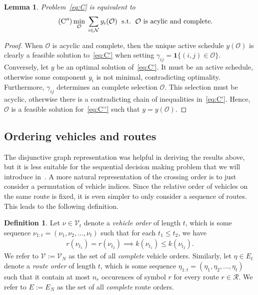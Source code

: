 \documentclass{report}
\theoremstyle{definition}
\newtheorem{define}{Definition}[chapter]
\theoremstyle{plain}
\newtheorem{lemma}{Lemma}[chapter]
\begin{document}
\begin{lemma}\label{lemma:disj-graph-optimization}
  Problem~\eqref{eq:C} is equivalent to
  \begin{align}
    \label{eq:C''}
    \tag{$\mathrm{C}^{\prime\prime}$}
    \min_{\mathcal{O}} \; \sum_{i \in \mathcal{N}} y_i(\mathcal{O}) \; \text{ s.t. } \, \mathcal{O} \text{ is acylic and complete. }
  \end{align}
\end{lemma}
\begin{proof}
  When $\mathcal{O}$ is acyclic and complete, then the unique active schedule
  $y(\mathcal{O})$ is clearly a feasible solution to~\eqref{eq:C'} when setting
  $\gamma_{ij} = \mathbf{1} \{ (i,j) \in \mathcal{O} \}$.
  Conversely, let $y$ be an optimal solution of~\eqref{eq:C'}. It must be an active
  schedule, otherwise some component $y_i$ is not minimal, contradicting
  optimality. Furthermore, $\gamma_{ij}$ determines an complete selection
  $\mathcal{O}$. This selection must be acyclic, otherwise there is a
  contradicting chain of inequalities in~\eqref{eq:C'}.
  Hence, $\mathcal{O}$ is a feasible solution
  for~\eqref{eq:C''} such that $y = y(\mathcal{O})$.
\end{proof}

\clearpage
\subsection{Ordering vehicles and routes}

The disjunctive graph representation was helpful in deriving the results above,
but it is less suitable for the sequential decision making problem that we will
introduce in~.
%
A more natural representation of the crossing order is to just consider a
permutation of vehicle indices.
%
Since the relative order of vehicles on the same route is fixed, it is even
simpler to only consider a sequence of routes.
%
This leads to the following definition.

\begin{define}
  Let $\nu \in \mathcal{V}_t$ denote a \emph{vehicle order} of length $t$,
  which is some sequence $\nu_{1:t} = (\nu_1, \nu_2, \dots, \nu_t)$ such that for each
  $t_1 \leq t_2$, we have
  \begin{align}\label{eq:order-respecting}
    r(\nu_{t_1}) = r(\nu_{t_2}) \implies k(\nu_{t_1}) \leq k(\nu_{t_2}) .
  \end{align}
  We refer to $\mathcal{V} := \mathcal{V}_N$ as the set of all \emph{complete}
  vehicle orders.
  Similarly, let $\eta \in E_t$ denote a \emph{route order} of length $t$, which is some
  sequence $\eta_{1:t} = (\eta_1, \eta_2, \dots, \eta_t)$ such that it contain at most
  $n_r$ occurences of symbol $r$ for every route $r \in \mathcal{R}$. We refer to
  $E := E_N$ as the set of all \emph{complete} route orders.
\end{define}
\end{document}
